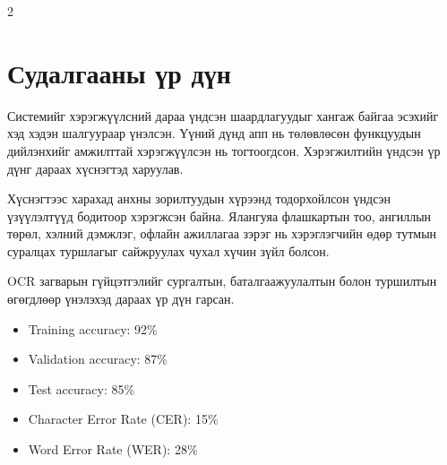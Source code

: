 \begin{multicols}{2}
\vspace{-6pt}
\section*{Судалгааны үр дүн}
Системийг хэрэгжүүлсний дараа үндсэн шаардлагуудыг хангаж байгаа эсэхийг хэд хэдэн шалгуураар үнэлсэн. Үүний дүнд апп нь төлөвлөсөн функцуудын дийлэнхийг амжилттай хэрэгжүүлсэн нь тогтоогдсон. Хэрэгжилтийн үндсэн үр дүнг дараах хүснэгтэд харуулав.

\begin{center}
\label{tab:appendixB-system-results}
\small
{}
\end{center}

Хүснэгтээс харахад анхны зорилтуудын хүрээнд тодорхойлсон үндсэн үзүүлэлтүүд бодитоор хэрэгжсэн байна. Ялангуяа флашкартын тоо, ангиллын төрөл, хэлний дэмжлэг, офлайн ажиллагаа зэрэг нь хэрэглэгчийн өдөр тутмын суралцах туршлагыг сайжруулах чухал хүчин зүйл болсон.

OCR загварын гүйцэтгэлийг сургалтын, баталгаажуулалтын болон туршилтын өгөгдлөөр үнэлэхэд дараах үр дүн гарсан.

\begin{itemize}
    \item Training accuracy: 92\%
    \item Validation accuracy: 87\%
    \item Test accuracy: 85\%
    \item Character Error Rate (CER): 15\%
    \item Word Error Rate (WER): 28\%
\end{itemize}


\end{multicols}
